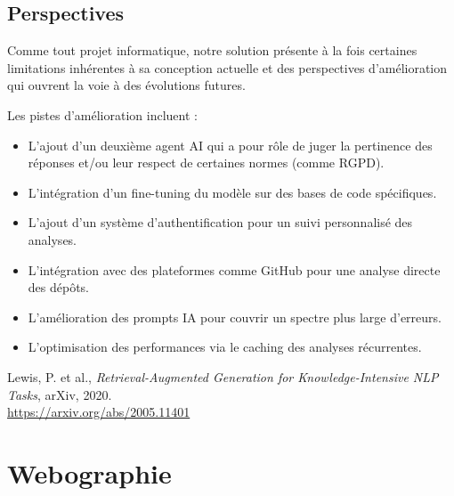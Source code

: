 \documentclass[12pt,a4paper]{report}
\begin{document}
	\section*{Perspectives}
	
	Comme tout projet informatique, notre solution présente à la fois certaines limitations inhérentes à sa conception actuelle et des perspectives d'amélioration qui ouvrent la voie à des évolutions futures.
	
	Les pistes d'amélioration incluent :
	
	\begin{itemize}
		
		\item L'ajout d'un deuxième agent AI qui a pour rôle de juger la pertinence des réponses et/ou leur respect de certaines normes (comme RGPD).
		
		\item L’intégration d’un fine-tuning du modèle sur des bases de code spécifiques.
		
		\item L'ajout d'un système d'authentification pour un suivi personnalisé des analyses.
		
		\item  L'intégration avec des plateformes comme GitHub pour une analyse directe des dépôts. 
		
		\item L'amélioration des prompts IA pour couvrir un spectre plus large d'erreurs.
	
		\item L'optimisation des performances via le caching des analyses récurrentes.
		
	\end{itemize}
	
	\clearpage
	
	\begin{thebibliography}{9}
		
		Lewis, P. et al., \emph{Retrieval-Augmented Generation for Knowledge-Intensive NLP Tasks}, arXiv, 2020.\\
		\url{https://arxiv.org/abs/2005.11401}
		
	\end{thebibliography}
	
	\chapter*{Webographie}
	
\end{document}

